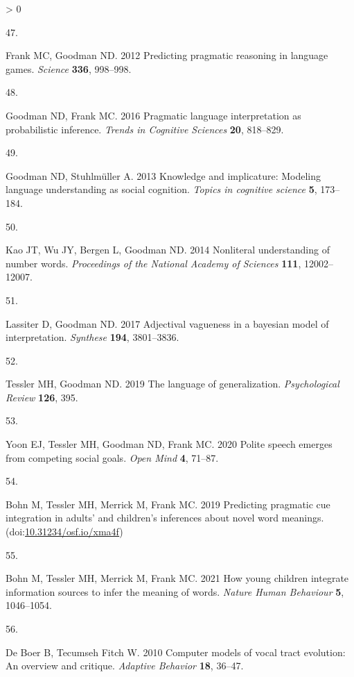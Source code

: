 \documentclass[
  english,
  man,floatsintext]{apa6}
\newlength{\cslhangindent}
\newlength{\csllabelwidth}
\newenvironment{CSLReferences}[2] %
 {%
  \setlength{\parindent}{0pt}
  \ifodd #1 \everypar{\setlength{\hangindent}{\cslhangindent}}\ignorespaces\fi
  \ifnum #2 > 0
  \setlength{\parskip}{#2\baselineskip}
  \fi
 }%
 {}
\newcommand{\CSLLeftMargin}[1]{\parbox[t]{\csllabelwidth}{#1}}
\newcommand{\CSLRightInline}[1]{\parbox[t]{\linewidth - \csllabelwidth}{#1}\break}
\begin{document}
\begin{CSLReferences}{0}{0}
\leavevmode\hypertarget{ref-frank2012predicting}{}%
\CSLLeftMargin{47. }
\CSLRightInline{Frank MC, Goodman ND. 2012 Predicting pragmatic reasoning in language games. \emph{Science} \textbf{336}, 998--998.}

\leavevmode\hypertarget{ref-goodman2016pragmatic}{}%
\CSLLeftMargin{48. }
\CSLRightInline{Goodman ND, Frank MC. 2016 Pragmatic language interpretation as probabilistic inference. \emph{Trends in Cognitive Sciences} \textbf{20}, 818--829.}

\leavevmode\hypertarget{ref-goodman2013knowledge}{}%
\CSLLeftMargin{49. }
\CSLRightInline{Goodman ND, Stuhlmüller A. 2013 Knowledge and implicature: Modeling language understanding as social cognition. \emph{Topics in cognitive science} \textbf{5}, 173--184.}

\leavevmode\hypertarget{ref-kao2014nonliteral}{}%
\CSLLeftMargin{50. }
\CSLRightInline{Kao JT, Wu JY, Bergen L, Goodman ND. 2014 Nonliteral understanding of number words. \emph{Proceedings of the National Academy of Sciences} \textbf{111}, 12002--12007.}

\leavevmode\hypertarget{ref-lassiter2017adjectival}{}%
\CSLLeftMargin{51. }
\CSLRightInline{Lassiter D, Goodman ND. 2017 Adjectival vagueness in a bayesian model of interpretation. \emph{Synthese} \textbf{194}, 3801--3836.}

\leavevmode\hypertarget{ref-tessler2019language}{}%
\CSLLeftMargin{52. }
\CSLRightInline{Tessler MH, Goodman ND. 2019 The language of generalization. \emph{Psychological Review} \textbf{126}, 395.}

\leavevmode\hypertarget{ref-yoon2020polite}{}%
\CSLLeftMargin{53. }
\CSLRightInline{Yoon EJ, Tessler MH, Goodman ND, Frank MC. 2020 Polite speech emerges from competing social goals. \emph{Open Mind} \textbf{4}, 71--87.}

\leavevmode\hypertarget{ref-bohn_tessler_merrick_frank_2019}{}%
\CSLLeftMargin{54. }
\CSLRightInline{Bohn M, Tessler MH, Merrick M, Frank MC. 2019 Predicting pragmatic cue integration in adults' and children's inferences about novel word meanings. (doi:\href{https://doi.org/10.31234/osf.io/xma4f}{10.31234/osf.io/xma4f})}

\leavevmode\hypertarget{ref-bohn2021young}{}%
\CSLLeftMargin{55. }
\CSLRightInline{Bohn M, Tessler MH, Merrick M, Frank MC. 2021 How young children integrate information sources to infer the meaning of words. \emph{Nature Human Behaviour} \textbf{5}, 1046--1054.}

\leavevmode\hypertarget{ref-de2010computer}{}%
\CSLLeftMargin{56. }
\CSLRightInline{De Boer B, Tecumseh Fitch W. 2010 Computer models of vocal tract evolution: An overview and critique. \emph{Adaptive Behavior} \textbf{18}, 36--47.}


\end{CSLReferences}
\end{document}
